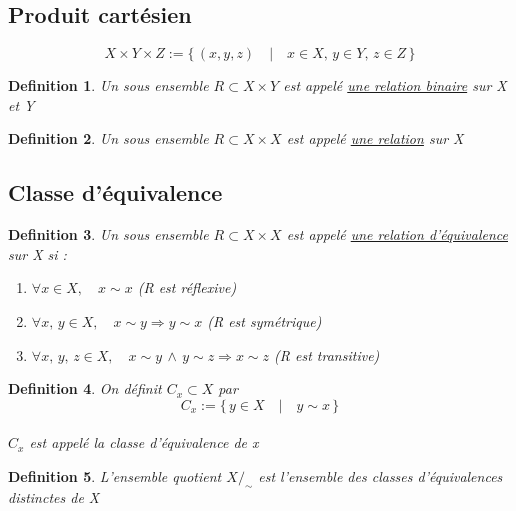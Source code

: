 \documentclass{article}
\newtheorem{definition}{Definition}[section]
\begin{document}
\subsection{Produit cartésien}
\[ X \times Y \times Z := \{\,(x,y,z)\quad |\quad x \in X,\,y \in Y,\, z \in Z\, \} \]
\begin{definition}
    Un sous ensemble \(R \subset X \times Y\) est appelé \underline{une relation binaire} sur X et Y
\end{definition}
\begin{definition}
    Un sous ensemble \(R \subset X \times X\) est appelé \underline{une relation} sur X
\end{definition}

\subsection{Classe d'équivalence}
\begin{definition}
    Un sous ensemble \(R \subset X \times X\) est appelé \underline{une relation d'équivalence} sur X si :
    \begin{enumerate}
        \item \( \forall x \in X,\quad x \sim x \) (R est réflexive)
        \item \( \forall x,\,y \in X,\quad  x \sim y \Rightarrow y \sim x \) (R est symétrique)
        \item \( \forall x,\,y,\, z \in X,\quad x \sim y\, \wedge\, y \sim z \Rightarrow x \sim z \) (R est transitive)
    \end{enumerate}
\end{definition}
\begin{definition}
    On définit \(C_x \subset X \) par \\ \[ C_x := \{\, y \in X\quad |\quad y \sim x\, \} \] \\
    \(C_x\) est appelé la classe d'équivalence de x
\end{definition}
\begin{definition}
    L'ensemble quotient \(X/_\sim \) est l'ensemble des classes d'équivalences distinctes de X
\end{definition}
\end{document}
